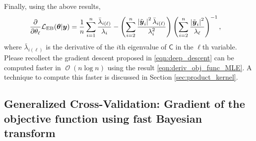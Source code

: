 \documentclass{svjour3}                     %
\DeclareMathOperator{\Order}{{\mathcal O}}
\newcommand{\bm}[1]{\boldsymbol{#1}}
\newcommand{\vtheta}{{\bm{\theta}}}
\newcommand{\vy}{\bm{y}}
\newcommand{\tvy}{\tilde{\bm{y}}}
\newcommand{\mC}{\mathsf{C}}
\newcommand{\MLE}{\textup{EB}}
\def\abs#1{\ensuremath{\left \lvert #1 \right \rvert}}
\begin{document}
Finally, using the above results,
\begin{align}
\label{eqn:deriv_obj_func_MLE}
\frac{\partial}{\partial \theta_\ell} \mathcal{L}_{\MLE}(\vtheta | \vy)
&=  \frac 1n \sum_{i=1}^{n} \frac{\bar{\lambda}_{i(\ell)}}{\lambda_i}
- \left({ \sum_{i=2}^n \frac{\abs{\tvy_i}^2 \bar{\lambda}_{i(\ell)}}{\lambda_i^2}}\right)
\left( {\sum_{i=2}^n \frac{\abs{\tvy_i}^2}{\lambda_\ell}} \right)^{-1},
\end{align}
where $\bar{\lambda}_{i(\ell)}$ is the derivative of the $i$th eigenvalue of $\mC$ in the $\ell$th variable. Please recollect the gradient descent proposed in \eqref{eqn:deep_descent} can be computed faster in $\Order(n \log n)$ using the result \eqref{eqn:deriv_obj_func_MLE}. A technique to compute this faster is discussed in Section \ref{sec:product_kernel}. 

\subsection{Generalized Cross-Validation: Gradient of the objective function using fast Bayesian transform}
\end{document}

